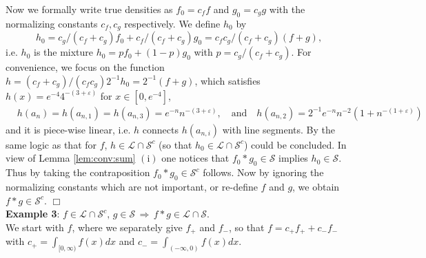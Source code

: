 \documentclass[12pt,leqno]{amsart}
\newcommand{\R}{\mathbb{R}}
\newcommand{\vep}{\varepsilon}
\newcommand{\cals}{{\mathcal S}}
\newcommand{\call}{{\mathcal L}}
\renewcommand{\P }{{\mathbb P}}
\newcommand{\1}{{\mathbf 1}}
\begin{document}
Now we formally write true densities as $f_0=c_f f$ and $g_0=c_g g$ with the normalizing constants 
$c_f,c_g$ respectively. 
We define $h_0$ by 
\[
 h_0= c_g/(c_f+c_g)f_0 + c_f/(c_f+c_g) g_0 = c_f c_g/(c_f+c_g) (f+g), 
\]
i.e. $h_0$ is the mixture $h_0=p f_0+(1-p)g_0$ with $p=c_g/(c_f+c_g)$. 
For convenience, we focus on the function $h=(c_f+c_g)/(c_fc_g) 2^{-1} h_0=2^{-1}(f+g)$, 
which satisfies $h(x)=e^{-4}4^{-(3+\vep)}$ for $x\in[0,e^{-4}]$, 
\begin{align*}
& h(a_n)=h(a_{n,1})=h(a_{n,3})=e^{-n}n^{-(3+\vep)},\quad 
 \text{and}\quad h(a_{n,2})= 2^{-1}e^{-n}n^{-2}(1+n^{-(1+\vep)}) 
\end{align*}
and it is piece-wise linear, i.e. $h$ connects $h(a_{n,i})$ with line segments. 
By the same logic as that for $f$, $h\in \call\cap \cals^c$ (so that $h_0 \in \call \cap \cals^c$) 
could be concluded. 
In view of Lemma \ref{lem:conv:sum} $(\mathrm{i})$ one notices that $f_0\ast g_0\in \cals$ implies $h_0 \in \cals$. 
Thus by taking the contraposition $f_0\ast g_0 \in \cals^c$ follows. Now by ignoring the normalizing constants which are not important, 
or 
re-define $f$ and $g$, we obtain $f\ast g\in \cals^c$.  
\hfill $\Box$\\




\noindent
{\bf Example 3}: $f \in \call \cap \cals^c,\,g\in\cals\, \Rightarrow\, f\ast g \in \call \cap \cals$. \\
We start with $f$, where we separately give $f_+$ and $f_-$, so that 
$f=c_+f_++c_-f_-$ with $c_+=\int_{[0,\infty)}f(x)dx$ and $c_-=\int_{(-\infty,0)}f(x)dx$.
\end{document}
